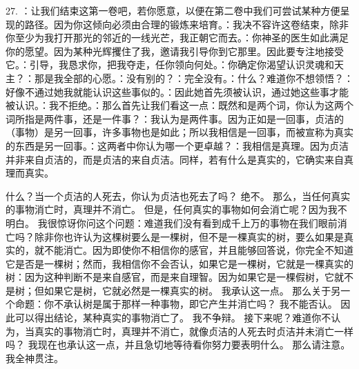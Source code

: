 27. ：让我们结束这第一卷吧，若你愿意，以便在第二卷中我们可尝试某种方便呈现的路径。因为你这倾向必须由合理的锻炼来培育。：我决不容许这卷结束，除非你至少为我打开那光的邻近的一线光芒，我正朝它而去。：你神圣的医生如此满足你的愿望。因为某种光辉攫住了我，邀请我引导你到它那里。因此要专注地接受它。：引导，我恳求你，把我夺走，任你领向何处。：你确定你渴望认识灵魂和天主？：那是我全部的心愿。：没有别的？：完全没有。：什么？难道你不想领悟？：好像不通过她我就能认识这些事似的。：因此她首先须被认识，通过她这些事才能被认识。：我不拒绝。：那么首先让我们看这一点：既然和是两个词，你认为这两个词所指是两件事，还是一件事？：我认为是两件事。因为正如是一回事，贞洁的（事物）是另一回事，许多事物也是如此；所以我相信是一回事，而被宣称为真实的东西是另一回事。：这两者中你认为哪一个更卓越？：我相信是真理。因为贞洁并非来自贞洁的，而是贞洁的来自贞洁。同样，若有什么是真实的，它确实来自真理而真实。\par

 什么？当一个贞洁的人死去，你认为贞洁也死去了吗？ 绝不。 那么，当任何真实的事物消亡时，真理并不消亡。 但是，任何真实的事物如何会消亡呢？因为我不明白。 我很惊讶你问这个问题：难道我们没有看到成千上万的事物在我们眼前消亡吗？除非你也许认为这棵树要么是一棵树，但不是一棵真实的树，要么如果是真实的，就不能消亡。因为即使你不相信你的感官，并且能够回答说，你完全不知道它是否是一棵树；然而，我相信你不会否认，如果它是一棵树，它就是一棵真实的树：因为这种判断不是来自感官，而是来自理智。因为如果它是一棵假树，它就不是树；但如果它是树，它就必然是一棵真实的树。 我承认这一点。 那么关于另一个命题：你不承认树是属于那样一种事物，即它产生并消亡吗？ 我不能否认。 因此可以得出结论，某种真实的事物消亡了。 我不争辩。 接下来呢？难道你不认为，当真实的事物消亡时，真理并不消亡，就像贞洁的人死去时贞洁并未消亡一样吗？ 我现在也承认这一点，并且急切地等待看你努力要表明什么。 那么请注意。 我全神贯注。\par

